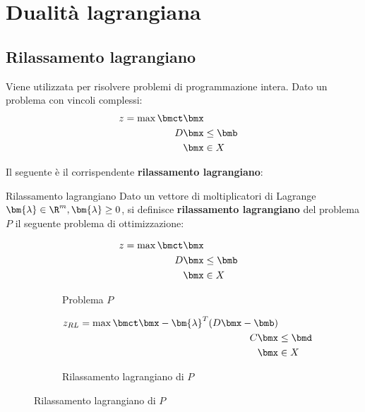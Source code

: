 \documentclass[\main/main.tex]{subfiles}
\begin{document}
\chapter{Dualità lagrangiana}
\section{Rilassamento lagrangiano}
Viene utilizzata per risolvere problemi di programmazione intera. Dato un problema con vincoli complessi:
\begin{align*}
    z = \max \bmct\bmx \\
    D\bmx &\leq \bmb \\
    \bmx &\in X
\end{align*}

Il seguente è il corrispendente \textbf{rilassamento lagrangiano}:

\begin{definition}{Rilassamento lagrangiano}
    Dato un vettore di moltiplicatori di Lagrange \(\bm{\lambda} \in \R^m, \bm{\lambda}\geq 0\), si definisce \textbf{rilassamento lagrangiano} del problema \(P\) il seguente problema di ottimizzazione:
    \begin{figure}
        \begin{subfigure}{0.49\textwidth}
            \begin{align*}
                z = \max \bmct\bmx \\
                D\bmx &\leq \bmb \\
                \bmx &\in X
            \end{align*}
            \caption{Problema \(P\)}
        \end{subfigure}
        \begin{subfigure}{0.49\textwidth}
            \begin{align*}
                z_{RL} = \max \bmct\bmx - \bm{\lambda}^T(D\bmx-\bmb) \\
                C\bmx &\leq \bmd \\
                \bmx &\in X
            \end{align*}
            \caption{Rilassamento lagrangiano di \(P\)}
        \end{subfigure}
    \end{figure}
\end{definition}
\end{document}
